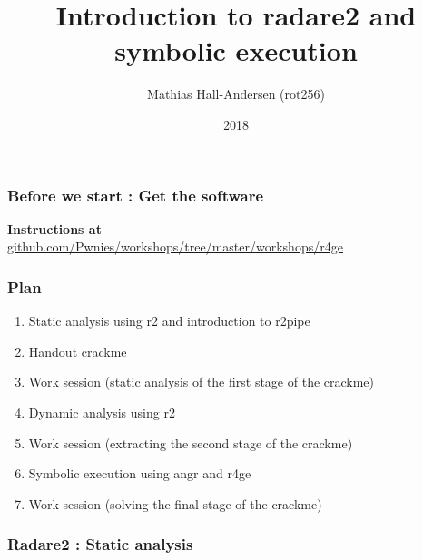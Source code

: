 \documentclass{beamer}
\title{Introduction to radare2 and symbolic execution}
\author{Mathias Hall-Andersen (rot256)}
\institute{Pwnies @ Copenhagen University}
\date{2018}
\begin{document}
\frame{\titlepage}

\begin{frame}
\frametitle{Before we start : Get the software}
\textbf{Instructions at} \\
{\small \url{github.com/Pwnies/workshops/tree/master/workshops/r4ge}}
\end{frame}

\begin{frame}
\frametitle{Plan}
\begin{enumerate}
    \item Static analysis using r2 and introduction to r2pipe
    \item Handout crackme
    \item Work session (static analysis of the first stage of the crackme)
    \item Dynamic analysis using r2
    \item Work session (extracting the second stage of the crackme)
    \item Symbolic execution using angr and r4ge
    \item Work session (solving the final stage of the crackme)
\end{enumerate}
\end{frame}

\begin{frame}
\frametitle{Radare2 : Static analysis}




\end{frame}
\end{document}
